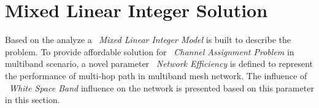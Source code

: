 \section{Mixed Linear Integer Solution}
\label{sec:linearopt}


Based on the analyze a ~\emph{Mixed Linear Integer Model} is built to describe the problem.                                        
To provide affordable solution for ~\emph{Channel Assignment Problem} in multiband scenario, a novel parameter ~\emph{Network Efficiency} is defined to represent the performance of multi-hop path in multiband mesh network.
The influence of ~\emph{White Space Band} influence on the network is presented based on this parameter in this section.

